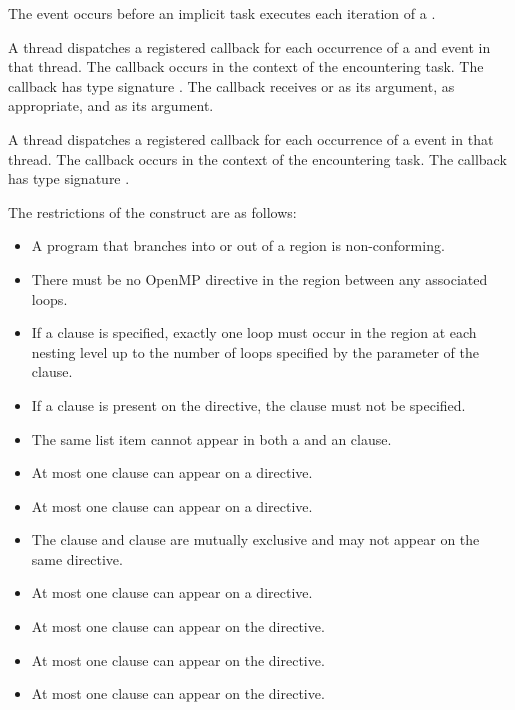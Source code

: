 The  event occurs before an implicit
task executes each iteration of a .

\tools

A thread dispatches a registered 
callback for each occurrence of a  and
 event in that thread. The callback occurs in the
context of the encountering task.  The callback has type signature
. The callback receives
 or 
as its  argument, as appropriate, and
 as its  argument.

A thread dispatches a registered 
callback for each occurrence of a  
event in that thread. The callback occurs in the
context of the encountering task.  The callback has type signature
. 

\restrictions
The restrictions of the  construct are as follows:
\begin{itemize}
\item A program that branches into or out of a  region is non-conforming.

\item There must be no OpenMP directive in the region between any
associated loops.

\item If a  clause is specified, exactly one loop must
occur in the region at each nesting level up to the number of loops
specified by the parameter of the  clause.

\item If a  clause is present on the  directive, the  clause must not be specified.
\item The same list item cannot appear in both a  and an  clause.
\item At most one  clause can appear on a  directive.
\item At most one  clause can appear on a  directive.
\item The  clause and  clause are mutually exclusive and may not appear on the same  directive.
\item At most one  clause can appear on a  directive.
\item At most one  clause can appear on the directive.
\item At most one  clause can appear on the directive.
\item At most one  clause can appear on the directive.
\end{itemize}

